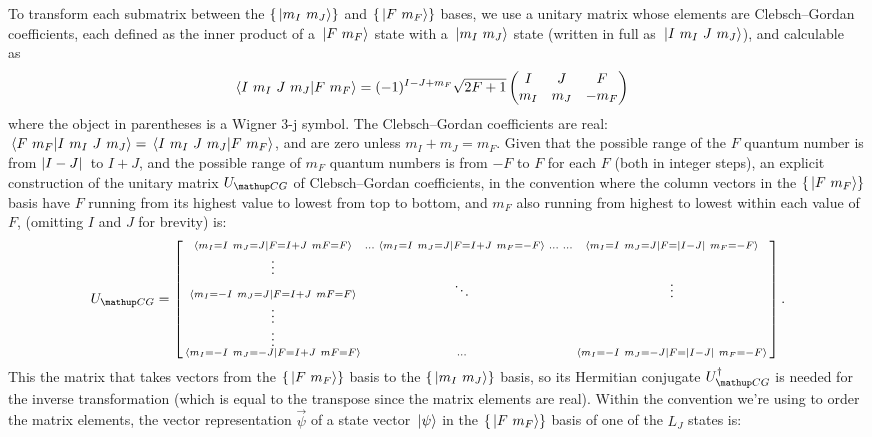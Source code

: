 To transform each submatrix between the $\{\ket{m_I\ m_J}\}$ and $\{\ket{F\ m_F}\}$ bases, we use a unitary matrix whose elements are Clebsch--Gordan coefficients, each defined as the inner product of a $\ket{F\ m_F}$ state with a $\ket{m_I\ m_J}$ state (written in full as $\ket{I\ m_I\ J\ m_J}$), and calculable as~\cite{steck_rubidium_2015}
\begin{align}\label{eq:ClebschGordanCoeffs}
\braket{I\ m_I\ J\ m_J}{F\ m_F} &=
(-1)^{I - J + m_F}\sqrt{2F + 1}
\left(\begin{matrix}
I & J & F\\
m_I & m_J & -m_F\\
\end{matrix}\right)
\end{align}
where the object in parentheses is a Wigner $3$-j symbol. The Clebsch--Gordan coefficients are real: $\braket{F\ m_F}{I\ m_I\ J\ m_J} = \braket{I\ m_I\ J\ m_J}{F\ m_F}$, and are zero unless $m_I + m_J = m_F$.
Given that the possible range of the $F$ quantum number is from $\abs{I - J}$ to $I + J$, and the possible range of $m_F$ quantum numbers is from $-F$ to $F$ for each $F$ (both in integer steps), an explicit construction of the unitary matrix $U_\up{CG}$ of Clebsch--Gordan coefficients, in the convention where the column vectors in the $\{\ket{F\ m_F}\}$ basis have $F$ running from its highest value to lowest from top to bottom, and $m_F$ also running from highest to lowest within each value of $F$, (omitting $I$ and $J$ for brevity) is:
\begin{align}
U_\up{CG} = \left[\begin{smallmatrix}
\braket{m_I=I\ m_J=J}{F=I+J\ mF=F} & \hdots &
\braket{m_I=I\ m_J=J}{F=I+J\ m_F=-F} & \hdots &\hdots &
\braket{m_I=I\ m_J=J}{F=\abs{I - J}\ m_F=-F}\\
\vdots\\
\braket{m_I=-I\ m_J=J}{F=I+J\ mF=F} & & \ddots & & & \vdots\\
\vdots\\
\vdots\\
\braket{m_I=-I\ m_J=-J}{F=I+J\ mF=F} & & \hdots & & &
\braket{m_I=-I\ m_J=-J}{F=\abs{I - J}\ m_F=-F}\\
\end{smallmatrix}\right].
\end{align}
This the matrix that takes vectors from the $\{\ket{F\ m_F}\}$ basis to the $\{\ket{m_I\ m_J}\}$ basis, so its Hermitian conjugate $U^\dagger_\up{CG}$ is needed for the inverse transformation (which is equal to the transpose since the matrix elements are real). Within the convention we're using to order the matrix elements, the vector representation $\vec\psi$ of a state vector $\ket{\psi}$ in the $\{\ket{F\ m_F}\}$ basis of one of the $L_J$ states is:
